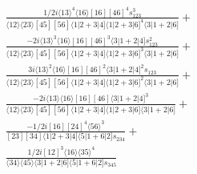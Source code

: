 \documentclass[varwidth, border=5pt]{standalone}
\begin{document}
\begin{my}
$\begin{gathered}
\scriptscriptstyle\frac{1/2i⟨13⟩^4⟨16⟩[16][46]^4s_{123}^3}{⟨12⟩⟨23⟩[45][56]⟨1|2+3|4]⟨1|2+3|6]^4⟨3|1+2|6]}+\\
\scriptscriptstyle\frac{-2i⟨13⟩^3⟨16⟩[16][46]^3⟨3|1+2|4]s_{123}^2}{⟨12⟩⟨23⟩[45][56]⟨1|2+3|4]⟨1|2+3|6]^3⟨3|1+2|6]}+\\
\scriptscriptstyle\frac{3i⟨13⟩^2⟨16⟩[16][46]^2⟨3|1+2|4]^2s_{123}}{⟨12⟩⟨23⟩[45][56]⟨1|2+3|4]⟨1|2+3|6]^2⟨3|1+2|6]}+\\
\scriptscriptstyle\frac{-2i⟨13⟩⟨16⟩[16][46]⟨3|1+2|4]^3}{⟨12⟩⟨23⟩[45][56]⟨1|2+3|4]⟨1|2+3|6]⟨3|1+2|6]}+\\
\scriptscriptstyle\frac{-1/2i[16][24]^4⟨56⟩^3}{[23][34]⟨1|2+3|4]⟨5|1+6|2]s_{234}}+\\
\scriptscriptstyle\frac{1/2i[12]^3⟨16⟩⟨35⟩^4}{⟨34⟩⟨45⟩⟨3|1+2|6]⟨5|1+6|2]s_{345}}\phantom{+}
\end{gathered}$
\end{my}
\end{document}

